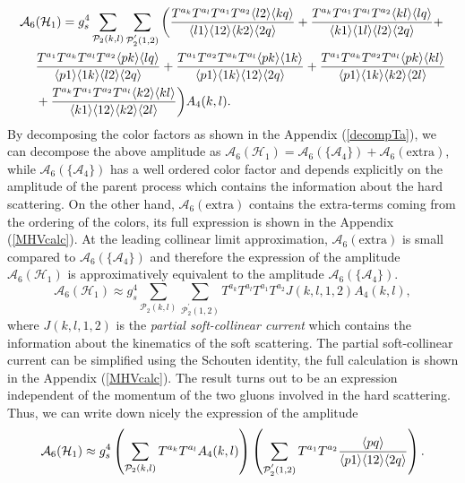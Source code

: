 \begin{align}
\mathcal{A}_6&(\mathcal{H}_1)= g^4_s \sum_{\mathcal{P}_2(k,l)} \sum_{\mathcal{P}^{'}_2(1,2)} \bigg( \frac{T^{a_k}T^{a_l}T^{a_1}T^{a_2} \langle l2\rangle \langle kq\rangle}{\langle l1\rangle \langle12\rangle \langle k2\rangle \langle2q\rangle} + \frac{T^{a_k}T^{a_1}T^{a_l}T^{a_2} \langle kl\rangle \langle lq\rangle}{\langle k1\rangle \langle1l\rangle \langle l2\rangle \langle2q\rangle} + \nonumber \\ 
& \frac{T^{a_1}T^{a_k}T^{a_l}T^{a_2} \langle pk\rangle \langle lq\rangle}{\langle p1\rangle \langle1k\rangle \langle l2\rangle \langle2q\rangle}+ \frac{T^{a_1}T^{a_2}T^{a_k}T^{a_l} \langle pk\rangle \langle1k\rangle}{\langle p1\rangle \langle1k\rangle \langle12\rangle \langle2q\rangle}+ 
\frac{T^{a_1}T^{a_k}T^{a_2}T^{a_l} \langle pk\rangle \langle kl\rangle}{\langle p1\rangle \langle1k\rangle \langle k2\rangle \langle2l\rangle} \nonumber \\
&+\frac{T^{a_k}T^{a_1}T^{a_2}T^{a_l} \langle k2\rangle \langle kl\rangle}{\langle k1\rangle \langle12\rangle \langle k2\rangle \langle2l\rangle} \bigg) A_4(k,l).
\end{align}
By decomposing the color factors as shown in the Appendix (\ref{decompTa}), we can decompose the above amplitude as $\mathcal{A}_6(\mathcal{H}_1)=\mathcal{A}_6(\{\mathcal{A}_4\})+\mathcal{A}_6(\text{extra})$, while $\mathcal{A}_6(\{\mathcal{A}_4\})$ has a well ordered color factor and depends explicitly on the amplitude of the parent process which contains the information about the hard scattering. On the other hand, $\mathcal{A}_6(\text{extra})$ contains the extra-terms coming from the ordering of the colors, its full expression is shown in the Appendix (\ref{MHVcalc}). At the leading collinear limit approximation, $\mathcal{A}_6(\text{extra})$ is small compared to $\mathcal{A}_6(\{\mathcal{A}_4\})$ and therefore the expression of the amplitude $\mathcal{A}_6(\mathcal{H}_1)$ is approximatively equivalent to the amplitude $\mathcal{A}_6(\{\mathcal{A}_4\})$.
\begin{equation}
\mathcal{A}_6(\mathcal{H}_1) \approx g^4_s \sum_{\mathcal{P}_2(k,l)} \sum_{\mathcal{P}^{'}_2(1,2)} T^{a_k}T^{a_l}T^{a_1}T^{a_2} J(k,l,1,2) A_4(k,l),
\end{equation} 
where $J(k,l,1,2)$ is the \emph{partial soft-collinear current} which contains the information about the kinematics of the soft scattering. The partial soft-collinear current can be simplified using the Schouten identity, the full calculation is shown in the Appendix (\ref{MHVcalc}). The result turns out to be an expression independent of the momentum of the two gluons involved in the hard scattering. Thus, we can write down nicely the expression of the amplitude
\begin{equation}
\mathcal{A}_6(\mathcal{H}_1) \approx g^4_s \left( \sum_{\mathcal{P}_2(k,l)} T^{a_k} T^{a_l} A_4(k,l)  \right) \left( \sum_{\mathcal{P}^{'}_2(1,2)} T^{a_1} T^{a_2} \frac{\langle pq\rangle}{\langle p1\rangle \langle12\rangle \langle2q\rangle} \right).
\end{equation}
